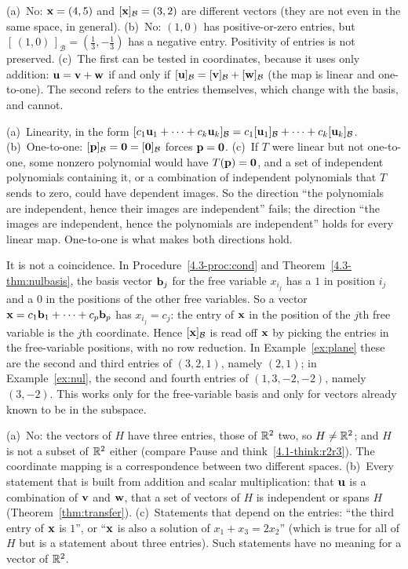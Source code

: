 \documentclass[11pt]{article}
\begin{document}
\begin{description}[leftmargin=0pt,itemsep=5pt]
  \item[Pause and think \ref{think:notpreserved}.] (a)~No: $\mathbf{x}=(4,5)$ and $[\mathbf{x}]_{\mathcal{B}}=(3,2)$ are different vectors (they are not even in the same space, in general). (b)~No: $(1,0)$ has positive-or-zero entries, but $[\,(1,0)\,]_{\mathcal{B}}=(\tfrac13,-\tfrac13)$ has a negative entry. Positivity of entries is not preserved. (c)~The first can be tested in coordinates, because it uses only addition: $\mathbf{u}=\mathbf{v}+\mathbf{w}$ if and only if $[\mathbf{u}]_{\mathcal{B}}=[\mathbf{v}]_{\mathcal{B}}+[\mathbf{w}]_{\mathcal{B}}$ (the map is linear and one-to-one). The second refers to the entries themselves, which change with the basis, and cannot.
  \item[Pause and think \ref{think:transfer}.] (a)~Linearity, in the form $[c_1\mathbf{u}_1+\cdots+c_k\mathbf{u}_k]_{\mathcal{B}}=c_1[\mathbf{u}_1]_{\mathcal{B}}+\cdots+c_k[\mathbf{u}_k]_{\mathcal{B}}$. (b)~One-to-one: $[\mathbf{p}]_{\mathcal{B}}=\mathbf{0}=[\mathbf{0}]_{\mathcal{B}}$ forces $\mathbf{p}=\mathbf{0}$. (c)~If $T$ were linear but not one-to-one, some nonzero polynomial would have $T(\mathbf{p})=\mathbf{0}$, and a set of independent polynomials containing it, or a combination of independent polynomials that $T$ sends to zero, could have dependent images. So the direction ``the polynomials are independent, hence their images are independent'' fails; the direction ``the images are independent, hence the polynomials are independent'' holds for every linear map. One-to-one is what makes both directions hold.
  \item[Pause and think \ref{think:freevars}.] It is not a coincidence. In Procedure~\ref{4.3-proc:cond} and Theorem~\ref{4.3-thm:nulbasis}, the basis vector $\mathbf{b}_j$ for the free variable $x_{i_j}$ has a $1$ in position $i_j$ and a $0$ in the positions of the other free variables. So a vector $\mathbf{x}=c_1\mathbf{b}_1+\cdots+c_p\mathbf{b}_p$ has $x_{i_j}=c_j$: the entry of $\mathbf{x}$ in the position of the $j$th free variable is the $j$th coordinate. Hence $[\mathbf{x}]_{\mathcal{B}}$ is read off $\mathbf{x}$ by picking the entries in the free-variable positions, with no row reduction. In Example~\ref{ex:plane} these are the second and third entries of $(3,2,1)$, namely $(2,1)$; in Example~\ref{ex:nul}, the second and fourth entries of $(1,3,-2,-2)$, namely $(3,-2)$. This works only for the free-variable basis and only for vectors already known to be in the subspace.
  \item[Pause and think \ref{think:planer2}.] (a)~No: the vectors of $H$ have three entries, those of $\mathbb{R}^2$ two, so $H\neq\mathbb{R}^2$; and $H$ is not a subset of $\mathbb{R}^2$ either (compare Pause and think~\ref{4.1-think:r2r3}). The coordinate mapping is a correspondence between two different spaces. (b)~Every statement that is built from addition and scalar multiplication: that $\mathbf{u}$ is a combination of $\mathbf{v}$ and $\mathbf{w}$, that a set of vectors of $H$ is independent or spans $H$ (Theorem~\ref{thm:transfer}). (c)~Statements that depend on the entries: ``the third entry of $\mathbf{x}$ is $1$'', or ``$\mathbf{x}$ is also a solution of $x_1+x_3=2x_2$'' (which is true for all of $H$ but is a statement about three entries). Such statements have no meaning for a vector of $\mathbb{R}^2$.

\end{description}
\end{document}
